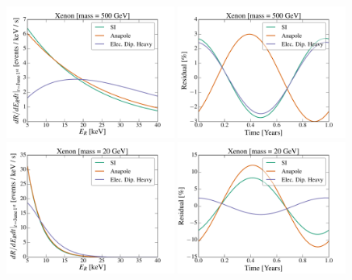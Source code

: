 \documentclass[11pt]{article}
\begin{document}

\begin{figure}
\centering
\includegraphics[width=0.49\textwidth, trim=0.cm 0.0cm 0.cm 0.0cm,clip=true]{plots/RecoilComparison_500GeV.pdf}
\includegraphics[width=0.49\textwidth, trim=0.cm 0.0cm 0.cm 0.0cm,clip=true]{plots/Xenon_SIvsAnapole_500GeV_Residual_Theory.pdf}
\includegraphics[width=0.49\textwidth, trim=0.cm 0.0cm 0.cm 0.0cm,clip=true]{plots/RecoilComparison_20GeV.pdf}
\includegraphics[width=0.49\textwidth, trim=0.cm 0.0cm 0.cm 0.0cm,clip=true]{plots/Xenon_SIvsAnapole_20GeV_Residual_Theory.pdf}

\end{figure}
\end{document}
